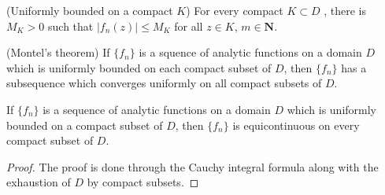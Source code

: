 \vspace{2ex}
\begin{defi}
(Uniformly bounded on a compact $K$) For every compact $K\subset D$ , there is $M_{K}>0$ such that $|f_{n}(z)|\leq M_{K}$ for all $z\in K$, $m\in {\bm N}$.
\end{defi}
\vspace{2ex}
\begin{thm}
(Montel's theorem) If $\{f_{n}\}$ is a squence of analytic functions on a domain $D$ which is uniformly bounded on each compact subset of $D$, then $\{f_{n}\}$ has a subsequence which converges uniformly on all compact subsets of $D$.
\end{thm}
\vspace{2ex}
\begin{thm}
If $\{f_{n}\}$ is a sequence of analytic functions on a domain $D$ which is uniformly bounded on a compact subset of $D$, then $\{f_{n}\}$ is equicontinuous on every compact subset of $D$. 
\end{thm}
\vspace{2ex}
\begin{proof}
The proof is done through the Cauchy integral formula along with the exhaustion of $D$ by compact subsets. 
\end{proof}
\vspace{2ex}

